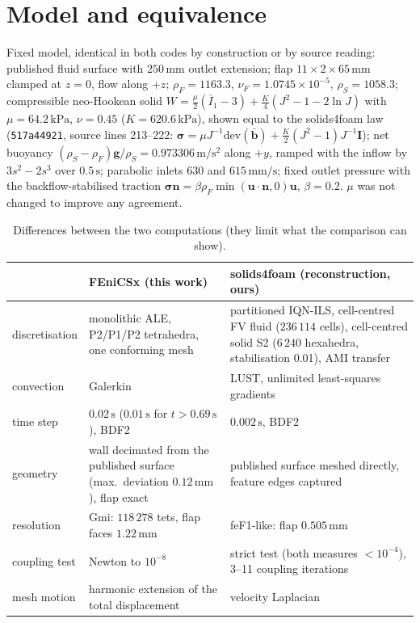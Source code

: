 \documentclass[sn-mathphys,Numbered]{sn-jnl}
\begin{document}
\section{Model and equivalence}\label{sec:model}
Fixed model, identical in both codes by construction or by source reading: published fluid surface with $250\,\mathrm{mm}$ outlet extension; flap $11\times2\times65\,\mathrm{mm}$ clamped at $z=0$, flow along $+z$; $\rho_F=1163.3$, $\nu_F=1.0745\times10^{-5}$, $\rho_S=1058.3$; compressible neo-Hookean solid $W=\tfrac{\mu}{2}(\bar I_1-3)+\tfrac{K}{4}(J^2-1-2\ln J)$ with $\mu=64.2\,\mathrm{kPa}$, $\nu=0.45$ ($K=620.6\,\mathrm{kPa}$), shown equal to the solids4foam law (\texttt{517a44921}, source lines 213--222: $\bm\sigma=\mu J^{-1}\mathrm{dev}(\bar{\bm b})+\tfrac K2 (J^2-1)J^{-1}\bm I$); net buoyancy $(\rho_S-\rho_F)\bm g/\rho_S=0.973306\,\mathrm{m/s^2}$ along $+y$, ramped with the inflow by $3s^2-2s^3$ over $0.5\,\mathrm{s}$; parabolic inlets $630$ and $615\,\mathrm{mm/s}$; fixed outlet pressure with the backflow-stabilised traction $\bm\sigma\bm n=\beta\rho_F\min(\bm u\cdot\bm n,0)\bm u$, $\beta=0.2$. $\mu$ was not changed to improve any agreement.
\begin{table}[htbp]\centering\caption{Differences between the two computations (they limit what the comparison can show).}\label{tab:diff}\small
\begin{tabular}{p{3.2cm}p{5.4cm}p{5.6cm}}\toprule
 & FEniCSx (this work) & solids4foam (reconstruction, ours)\\\midrule
discretisation & monolithic ALE, P2/P1/P2 tetrahedra, one conforming mesh & partitioned IQN-ILS, cell-centred FV fluid ($236\,114$ cells), cell-centred solid S2 ($6\,240$ hexahedra, stabilisation 0.01), AMI transfer\\
convection & Galerkin & LUST, unlimited least-squares gradients\\
time step & $0.02\,\mathrm{s}$ ($0.01\,\mathrm{s}$ for $t>0.69\,\mathrm{s}$), BDF2 & $0.002\,\mathrm{s}$, BDF2\\
geometry & wall decimated from the published surface (max.\ deviation $0.12\,\mathrm{mm}$), flap exact & published surface meshed directly, feature edges captured\\
resolution & Gmi: $118\,278$ tets, flap faces $1.22\,\mathrm{mm}$ & feF1-like: flap $0.505\,\mathrm{mm}$\\
coupling test & Newton to $10^{-8}$ & strict test (both measures $<10^{-4}$), 3--11 coupling iterations\\
mesh motion & harmonic extension of the total displacement & velocity Laplacian\\\bottomrule
\end{tabular}\end{table}
\end{document}
